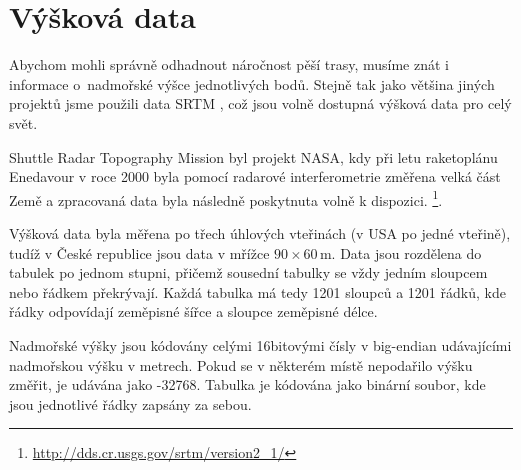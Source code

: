 \chapter{Výšková data}
Abychom mohli správně odhadnout náročnost pěší trasy, musíme znát i informace
o~nadmořské výšce jednotlivých bodů. Stejně tak jako většina jiných projektů jsme
použili data SRTM \cite{srtmweb}, což jsou volně dostupná výšková data pro celý
svět.

Shuttle Radar Topography Mission byl projekt NASA, kdy při letu raketoplánu
Enedavour v roce 2000 byla pomocí radarové interferometrie změřena velká část
Země a zpracovaná data byla následně poskytnuta volně k dispozici.
\footnote{\url{http://dds.cr.usgs.gov/srtm/version2_1/}}. 

Výšková data byla měřena po třech úhlových vteřinách (v USA po jedné vteřině),
tudíž v České republice jsou data v mřížce $90\times60$\,m. Data jsou rozdělena
do tabulek po jednom stupni, přičemž sousední tabulky se vždy jedním sloupcem
nebo řádkem překrývají. Každá tabulka má tedy 1201 sloupců a 1201 řádků, kde
řádky odpovídají zeměpisné šířce a sloupce zeměpisné délce.

Nadmořské výšky jsou kódovány celými 16bitovými čísly v big-endian udávajícími
nadmořskou výšku v metrech. Pokud se v některém místě nepodařilo výšku změřit,
je udávána jako -32768. Tabulka je kódována jako binární soubor, kde jsou
jednotlivé řádky zapsány za sebou.
